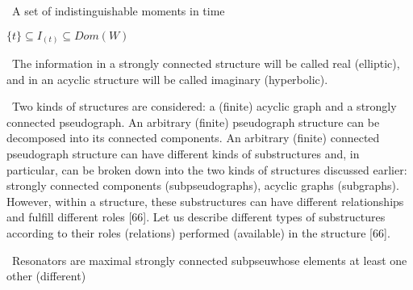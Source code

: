 \documentclass[10pt, a4paper]{article}
\begin{document}
\begin{multicols}{2}
\setlength{\parindent}{0.8cm}
\setlength{\parindent}{0.4cm}
\fontsize{10}{15}\selectfont
\par \ A set of indistinguishable moments in time
\begin{center}
\begin{math} \{t\} \subseteq I_{(t)}  \subseteq Dom(W)
\end{math}
\end{center}
\par \ The information in a strongly connected structure will be called real (elliptic), and in an acyclic structure will be called imaginary (hyperbolic).
\par \ Two kinds of structures are considered: a (finite)
acyclic graph and a strongly connected pseudograph. An
arbitrary (finite) pseudograph structure can be decomposed into its connected components. An arbitrary (finite) connected pseudograph structure can have different
kinds of substructures and, in particular, can be broken
down into the two kinds of structures discussed earlier: strongly connected components (subpseudographs),
acyclic graphs (subgraphs). However, within a structure,
these substructures can have different relationships and
fulfill different roles [66]. Let us describe different types of substructures according to their roles (relations) performed (available) in the structure [66].
\par \ Resonators are maximal strongly connected subpseuwhose elements at least one other (different) 
\end{multicols}
\end{document}

